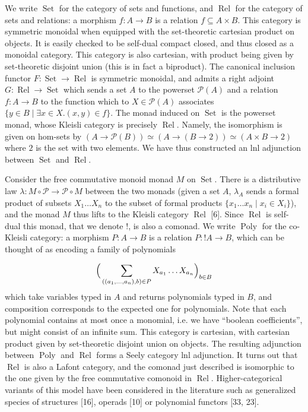  
We write $\operatorname{Set}$ for the category of sets and functions, and $\operatorname{Rel}$ for the category of sets and relations: a morphism $f:A\to B$ is a relation $f\subseteq A\times B$. This category is symmetric monoidal when equipped with the set-theoretic cartesian product on objects. It is easily checked to be self-dual compact closed, and thus closed as a monoidal category. This category is also cartesian, with product being given by set-theoretic disjoint union (this is in fact a biproduct). The canonical inclusion functor $F:\operatorname{Set}\to\operatorname{Rel}$ is symmetric monoidal, and admits a right adjoint $G:\operatorname{Rel}\to\operatorname{Set}$ which sends a set $A$ to the powerset $\mathcal{P}(A)$ and a relation $f:A\to B$ to the function which to $X\in\mathcal{P}(A)$ associates $\{y\in B\mid\exists x\in X.(x,y)\in f\}$. The monad induced on $\operatorname{Set}$ is the powerset monad, whose Kleisli category is precisely $\operatorname{Rel}$. Namely, the isomorphism is given on hom-sets by $(A\to\mathcal{P}(B))\simeq(A\to(B\to 2))\simeq(A\times B\to 2)$ where $2$ is the set with two elements. We have thus constructed an lnl adjunction between $\operatorname{Set}$ and $\operatorname{Rel}$.\par
 
 
 
Consider the free commutative monoid monad $M$ on $\operatorname{Set}$. There is a distributive law $\lambda:M\circ\mathcal{P}\to\mathcal{P}\circ M$ between the two monads (given a set $A$, $\lambda_{A}$ sends a formal product of subsets $X_{1}\ldots X_{n}$ to the subset of formal products $\{x_{1}\ldots x_{n}\mid x_{i}\in X_{i}\}$), and the monad $M$ thus lifts to the Kleisli category $\operatorname{Rel}$ [6]. Since $\operatorname{Rel}$ is self-dual this monad, that we denote $\mathop{!}$, is also a comonad. We write $\operatorname{Poly}$ for the co-Kleisli category: a morphism $P:A\to B$ is a relation $P:\mathop{!}A\to B$, which can be thought of as encoding a family of polynomials\par
    \[\Big{(}\sum_{((a_{1},\ldots,a_{n}),b)\in P}X_{a_{1}}\ldots X_{a_{n}}\Big{)}_{b\in B}\]    
which take variables typed in $A$ and returns polynomials typed in $B$, and composition corresponds to the expected one for polynomials. Note that each polynomial contains at most once a monomial, i.e. we have “boolean coefficients”, but might consist of an infinite sum. This category is cartesian, with cartesian product given by set-theoretic disjoint union on objects. The resulting adjunction between $\operatorname{Poly}$ and $\operatorname{Rel}$ forms a Seely category lnl adjunction. It turns out that $\operatorname{Rel}$ is also a Lafont category, and the comonad just described is isomorphic to the one given by the free commutative comonoid in $\operatorname{Rel}$. Higher-categorical variants of this model have been considered in the literature such as generalized species of structures [16], operads [10] or polynomial functors [33, 23].\par
 
